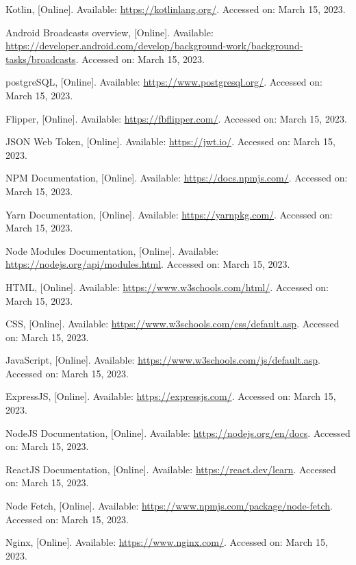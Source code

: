 \begin{thebibliography}{1}
    Kotlin, [Online]. Available: \url{https://kotlinlang.org/}. Accessed on: March 15, 2023.

    Android Broadcasts overview, [Online]. Available: \url{https://developer.android.com/develop/background-work/background-tasks/broadcasts}. Accessed on: March 15, 2023.

    postgreSQL, [Online]. Available: \url{https://www.postgresql.org/}. Accessed on: March 15, 2023.

    Flipper, [Online]. Available: \url{https://fbflipper.com/}. Accessed on: March 15, 2023.

    JSON Web Token, [Online]. Available: \url{https://jwt.io/}. Accessed on: March 15, 2023.

    NPM Documentation, [Online]. Available: \url{https://docs.npmjs.com/}. Accessed on: March 15, 2023.

    Yarn Documentation, [Online]. Available: \url{https://yarnpkg.com/}. Accessed on: March 15, 2023.

    Node Modules Documentation, [Online]. Available: \url{https://nodejs.org/api/modules.html}. Accessed on: March 15, 2023.

    HTML, [Online]. Available: \url{https://www.w3schools.com/html/}. Accessed on: March 15, 2023.

    CSS, [Online]. Available: \url{https://www.w3schools.com/css/default.asp}. Accessed on: March 15, 2023.

    JavaScript, [Online]. Available: \url{https://www.w3schools.com/js/default.asp}. Accessed on: March 15, 2023.

    ExpressJS, [Online]. Available: \url{https://expressjs.com/}. Accessed on: March 15, 2023.

    NodeJS Documentation, [Online]. Available: \url{https://nodejs.org/en/docs}. Accessed on: March 15, 2023.

    ReactJS Documentation, [Online]. Available: \url{https://react.dev/learn}. Accessed on: March 15, 2023.

    Node Fetch, [Online]. Available: \url{https://www.npmjs.com/package/node-fetch}. Accessed on: March 15, 2023.

    Nginx, [Online]. Available: \url{https://www.nginx.com/}. Accessed on: March 15, 2023.


\end{thebibliography}
